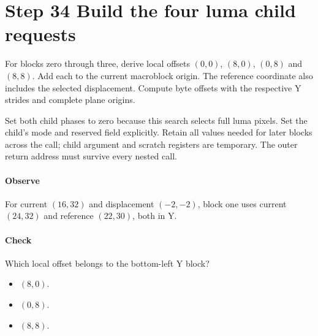 \section{Step 34 Build the four luma child requests}\label{h263-macroblock-s04}
For blocks zero through three, derive local offsets $(0,0)$, $(8,0)$, $(0,8)$
and $(8,8)$. Add each to the current macroblock origin. The reference coordinate
also includes the selected displacement. Compute byte offsets with the respective
Y strides and complete plane origins.

Set both child phases to zero because this search selects full luma pixels.
Set the child's mode and reserved field explicitly. Retain all values needed for
later blocks across the call; child argument and scratch registers are temporary.
The outer return address must survive every nested call.

\paragraph{Observe} For current $(16,32)$ and displacement $(-2,-2)$, block one
uses current $(24,32)$ and reference $(22,30)$, both in Y.
\paragraph{Check} Which local offset belongs to the bottom-left Y block?
\begin{itemize}
  \item[A.] $(8,0)$.
  \item[B.] $(0,8)$.
  \item[C.] $(8,8)$.
\end{itemize}
